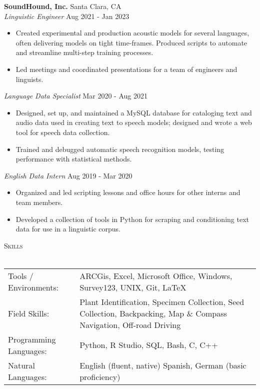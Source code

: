 \documentclass[]{article}
\newcommand{\lineunder} {
	\vspace*{-8pt} \\
	\hspace*{-18pt} \hrulefill \\
}
\newcommand{\header} [1] {
	{\hspace*{-18pt}\vspace*{6pt} \textsc{#1}}
	\vspace*{-6pt} \lineunder
}
\begin{document}
	
	\textbf{SoundHound, Inc.} \hfill Santa Clara, CA\\
	\textit{Linguistic Engineer} \hfill Aug 2021 - Jan 2023\\
	\vspace{-3mm}
	\begin{itemize} \itemsep 0pt
		\item Created experimental and production acoustic models for several languages, often delivering models on tight time-frames.  Produced scripts to automate and streamline multi-step training processes.
		\item Led meetings and coordinated presentations for a team of engineers and linguists.
	\end{itemize}
	\vspace{-2mm}
	\textit{Language Data Specialist} \hfill Mar 2020 - Aug 2021\\
	\vspace{-3mm}
	\begin{itemize} \itemsep 0pt
		\item Designed, set up, and maintained a MySQL database for cataloging text and audio data used in creating text to speech models; designed and wrote a web tool for speech data collection.
		\item Trained and debugged automatic speech recognition models, testing performance with statistical methods.
	\end{itemize}
	\vspace{-2mm}
	\textit{English Data Intern} \hfill Aug 2019 - Mar 2020\\
	\vspace{-3mm}
	\begin{itemize} \itemsep 0pt
		\item Organized and led scripting lessons and office hours for other interns and team members.
		\item Developed a collection of tools in Python for scraping and conditioning text data for use in a linguistic corpus.
	\end{itemize}

	\vspace{5mm}

	\header{Skills}
	\begin{tabular}{ p{45mm} p{11.2cm} }
		Tools / Environments:  & ARCGis, Excel, Microsoft Office, Windows, Survey123, UNIX, Git, \LaTeX
		\\
		Field Skills:          & Plant Identification, Specimen Collection, Seed Collection, Backpacking, Map \& Compass Navigation, Off-road Driving\\
		Programming Languages: & Python, R Studio, SQL, Bash, C, C++
		\\
		Natural Languages:     & English \hfill (fluent, native) \newline  Spanish, German \hfill (basic proficiency)
		\\
	\end{tabular}
	\vspace{2mm}
	
\end{document}
